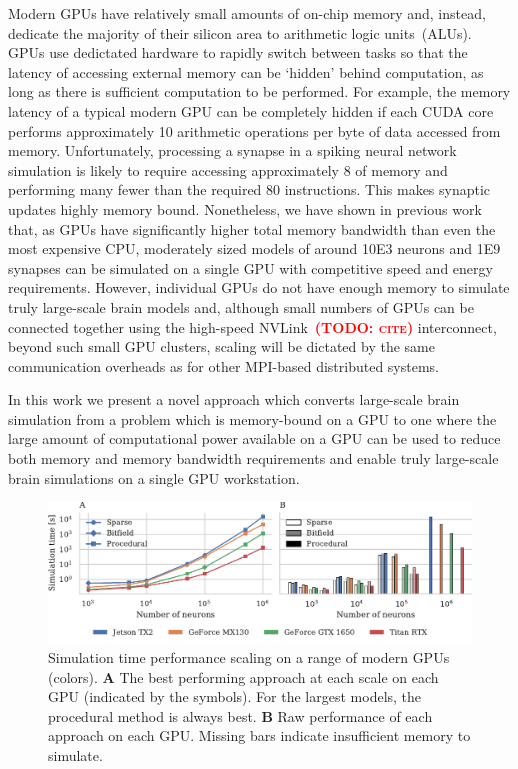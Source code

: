 \documentclass[9pt,twocolumn,twoside,lineno]{pnas-new}
\newcommand{\todo}[1]{\textbf{\textsc{\textcolor{red}{(TODO: #1)}}}}
\begin{document}
Modern GPUs have relatively small amounts of on-chip memory and, instead, dedicate the majority of their silicon area to arithmetic logic units~(ALUs).
GPUs use dedictated hardware to rapidly switch between tasks so that the latency of accessing external memory can be `hidden' behind computation, as long as there is sufficient computation to be performed.
For example, the memory latency of a typical modern GPU can be completely hidden if each CUDA core performs approximately 10 arithmetic operations per byte of data accessed from memory.
Unfortunately, processing a synapse in a spiking neural network simulation is likely to require accessing approximately \SI{8}{\byte} of memory and performing many fewer than the required 80 instructions. This makes synaptic updates highly memory bound.
Nonetheless, we have shown in previous work~\citep{Knight2018} that, as GPUs have significantly higher total memory bandwidth than even the most expensive CPU, moderately sized models of around \num{10E3} neurons and \num{1E9} synapses can be simulated on a single GPU with competitive speed and energy requirements.
However, individual GPUs do not have enough memory to simulate truly large-scale brain models and, although small numbers of GPUs can be connected together using the high-speed NVLink~\todo{cite} interconnect, beyond such small GPU clusters, scaling will be dictated by the same communication overheads as for other MPI-based distributed systems.

In this work we present a novel approach which converts large-scale brain simulation from a problem which is memory-bound on a GPU to one where the large amount of computational power available on a GPU can be used to reduce both memory and memory bandwidth requirements and enable truly large-scale brain simulations on a single GPU workstation.

\begin{figure}
    \centering
    \includegraphics{figures/performance_scaling}
    \caption{Simulation time performance scaling on a range of modern GPUs (colors). \textbf{A} The best performing approach at each scale on each GPU (indicated by the symbols). For the largest models, the procedural method is always best.
    \textbf{B} Raw performance of each approach on each GPU.
    Missing bars indicate insufficient memory to simulate.}
    \label{fig:performance_scaling}
\end{figure}
\end{document}
